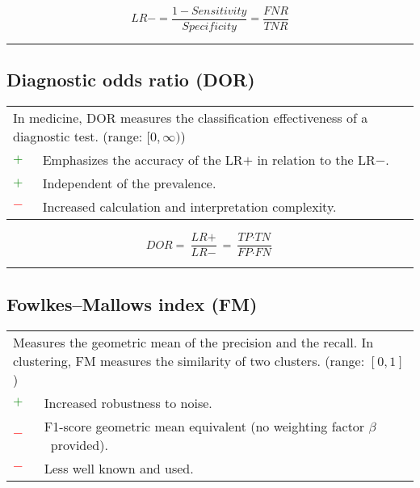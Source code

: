 \documentclass{article}
\begin{document}
\begin{equation}
	\textit{LR}- = \dfrac{1 - \textit{Sensitivity}}{\textit{Specificity}} = \dfrac{\textit{FNR}}{\textit{TNR}}
%
	\label{equation:LR-}
\end{equation}

\hrule


\subsection[Diagnostic odds ratio (DOR)]{Diagnostic odds ratio (DOR) \cite{glas2003diagnostic, doust2004systematic}}

\begin{table}[H]\centering
	\begin{tabular}{m{}m{}}
		\multicolumn{2}{m{0.95\textwidth}}{In medicine, DOR measures the classification effectiveness of a diagnostic test. \cite{glas2003diagnostic} (range: $[0, \infty)$)} \\
		\textcolor{Green}{$+$} & Emphasizes the accuracy of the LR$+$ in relation to the LR$-$. \\
		\textcolor{Green}{$+$} & Independent of the prevalence. \\
		\textcolor{Red}{$-$}   & Increased calculation and interpretation complexity.
	\end{tabular}
\end{table}

\begin{equation}
	\textit{DOR} = \dfrac{\textit{LR}+}{\textit{LR}-} = \dfrac{\textit{TP} \cdot \textit{TN}}{\textit{FP} \cdot \textit{FN}}
%
	\label{equation:DOR}
\end{equation}

\hrule


\subsection[Fowlkes--Mallows index (FM)]{Fowlkes--Mallows index (FM) \cite{fowlkes1983method, halkidi2001clustering}}

\begin{table}[H]\centering
	\begin{tabular}{m{}m{}}
		\multicolumn{2}{m{0.95\textwidth}}{Measures the geometric mean of the precision and the recall. In clustering, FM measures the similarity of two clusters. (range: $[0, 1]$)} \\
		\textcolor{Green}{$+$} & Increased robustness to noise. \\
		\textcolor{Red}{$-$}   & F1-score geometric mean equivalent (no weighting factor $\beta$~provided). \\
		\textcolor{Red}{$-$}   & Less well known and used.
	\end{tabular}
\end{table}
\end{document}
